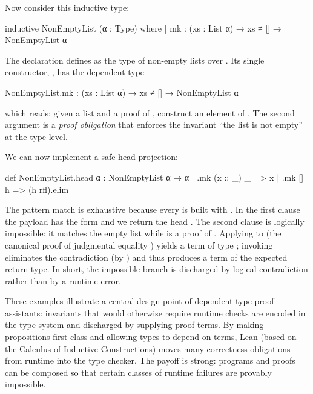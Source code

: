 Now consider this inductive type:

\begin{leanblock}
inductive NonEmptyList (α : Type) where
| mk : (xs : List α) → xs ≠ [] → NonEmptyList α
\end{leanblock}

The  declaration defines  as the type of non-empty lists over . Its single constructor, , has the dependent type
\begin{leanblock}
NonEmptyList.mk : (xs : List α) → xs ≠ [] → NonEmptyList α
\end{leanblock}
which reads: given a list  and a proof of , construct an element of . The second argument is a \emph{proof obligation} that enforces the invariant ``the list is not empty'' at the type level.

We can now implement a safe head projection:

\begin{leanblock}
def NonEmptyList.head {α} : NonEmptyList α → α
| .mk (x :: _) _ => x
| .mk [] h => (h rfl).elim
\end{leanblock}

The pattern match is exhaustive because every  is built with . In the first clause the payload has the form  and we return the head . The second clause is logically impossible: it matches the empty list \lean{[]} while  is a proof of . Applying  to  (the canonical proof of judgmental equality \lean{[] = []}) yields a term of type ; invoking  eliminates the contradiction (by ) and thus produces a term of the expected return type. In short, the impossible branch is discharged by logical contradiction rather than by a runtime error.

\bigskip

These examples illustrate a central design point of dependent-type proof assistants: invariants that would otherwise require runtime checks are encoded in the type system and discharged by supplying proof terms. By making propositions first-class and allowing types to depend on terms, Lean (based on the Calculus of Inductive Constructions) moves many correctness obligations from runtime into the type checker. The payoff is strong: programs and proofs can be composed so that certain classes of runtime failures are provably impossible.
